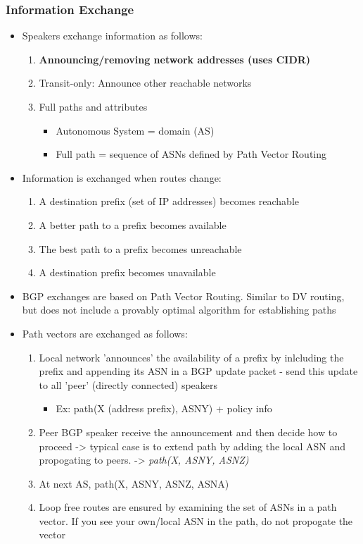 \documentclass[11pt]{article}
\begin{document}
\subsubsection{Information Exchange}
\label{sec:orgheadline93}
\begin{itemize}
\item Speakers exchange information as follows:
\begin{enumerate}
\item \textbf{Announcing/removing network addresses (uses CIDR)}
\item Transit-only: Announce other reachable networks
\item Full paths and attributes
\begin{itemize}
\item Autonomous System = domain (AS)
\item Full path = sequence of ASNs defined by Path Vector Routing
\end{itemize}
\end{enumerate}

\item Information is exchanged when routes change:
\begin{enumerate}
\item A destination prefix (set of IP addresses) becomes reachable
\item A better path to a prefix becomes available
\item The best path to a prefix becomes unreachable
\item A destination prefix becomes unavailable
\end{enumerate}

\item BGP exchanges are based on Path Vector Routing. Similar to DV
routing, but does not include a provably optimal algorithm for
establishing paths

\item Path vectors are exchanged as follows:
\begin{enumerate}
\item Local network 'announces' the availability of a prefix by
inlcluding the prefix and appending its ASN in a BGP update
packet - send this update to all 'peer' (directly connected)
speakers
\begin{itemize}
\item Ex: path(X (address prefix), ASNY) + policy info
\end{itemize}
\item Peer BGP speaker receive the announcement and then decide how to
proceed -> typical case is to extend path by adding the local ASN
and propogating to peers. -> \emph{path(X, ASNY, ASNZ)}
\item At next AS, path(X, ASNY, ASNZ, ASNA)
\item Loop free routes are ensured by examining the set of ASNs in a
path vector. If you see your own/local ASN in the path, do not
propogate the vector
\end{enumerate}


\end{itemize}
\end{document}
